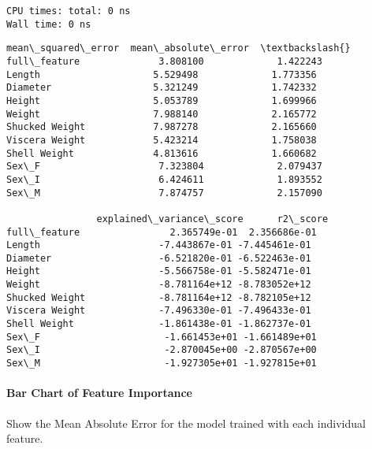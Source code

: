 \documentclass[11pt]{article}
\makeatletter
\newcommand{\boxspacing}{\kern\kvtcb@left@rule\kern\kvtcb@boxsep}
\newcommand{\prompt}[4]{
        {\ttfamily\llap{{\color{#2}[#3]:\hspace{3pt}#4}}\vspace{-\baselineskip}}
    }
\makeatother
\begin{document}
    \begin{Verbatim}[commandchars=\\\{\}]
CPU times: total: 0 ns
Wall time: 0 ns
    \end{Verbatim}

            \begin{tcolorbox}[breakable, size=fbox, boxrule=.5pt, pad at break*=1mm, opacityfill=0]
\prompt{Out}{outcolor}{116}{\boxspacing}
\begin{Verbatim}[commandchars=\\\{\}]
                mean\_squared\_error  mean\_absolute\_error  \textbackslash{}
full\_feature              3.808100             1.422243
Length                    5.529498             1.773356
Diameter                  5.321249             1.742332
Height                    5.053789             1.699966
Weight                    7.988140             2.165772
Shucked Weight            7.987278             2.165660
Viscera Weight            5.423214             1.758038
Shell Weight              4.813616             1.660682
Sex\_F                     7.323804             2.079437
Sex\_I                     6.424611             1.893552
Sex\_M                     7.874757             2.157090

                explained\_variance\_score      r2\_score
full\_feature                2.365749e-01  2.356686e-01
Length                     -7.443867e-01 -7.445461e-01
Diameter                   -6.521820e-01 -6.522463e-01
Height                     -5.566758e-01 -5.582471e-01
Weight                     -8.781164e+12 -8.783052e+12
Shucked Weight             -8.781164e+12 -8.782105e+12
Viscera Weight             -7.496330e-01 -7.496433e-01
Shell Weight               -1.861438e-01 -1.862737e-01
Sex\_F                      -1.661453e+01 -1.661489e+01
Sex\_I                      -2.870045e+00 -2.870567e+00
Sex\_M                      -1.927305e+01 -1.927815e+01
\end{Verbatim}
\end{tcolorbox}
        
    \paragraph{Bar Chart of Feature
Importance}\label{bar-chart-of-feature-importance}

Show the Mean Absolute Error for the model trained with each individual
feature.
\end{document}
